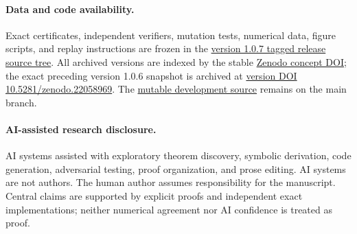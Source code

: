 \documentclass[11pt]{article}
\theoremstyle{definition}
\newcommand{\1}{\mathbf 1}
\begin{document}
\paragraph{Data and code availability.}
Exact certificates, independent verifiers, mutation tests, numerical data,
figure scripts, and replay instructions are frozen in the
\href{https://github.com/AlecKriebel/Math/tree/maximally-collective-stable-turing-v1.0.7/maximally_collective_stable_turing_patterns_binary_complex_mass_action_networks}{version 1.0.7 tagged release source tree}.
All archived versions are indexed by the stable
\href{https://doi.org/10.5281/zenodo.21753404}{Zenodo concept DOI}; the exact
preceding version 1.0.6 snapshot is archived at
\href{https://doi.org/10.5281/zenodo.22058969}{version DOI 10.5281/zenodo.22058969}.
The \href{https://github.com/AlecKriebel/Math/tree/main/maximally_collective_stable_turing_patterns_binary_complex_mass_action_networks}{mutable development source} remains on the main branch.

\paragraph{AI-assisted research disclosure.}
AI systems assisted with exploratory theorem discovery, symbolic derivation,
code generation, adversarial testing, proof organization, and prose editing.
AI systems are not authors.  The human author assumes responsibility for the
manuscript.  Central claims are supported by explicit proofs and independent
exact implementations; neither numerical agreement nor AI confidence is
treated as proof.

\begingroup
\renewcommand*{\bibfont}{\footnotesize}
\sloppy
\printbibliography
\endgroup
\end{document}
